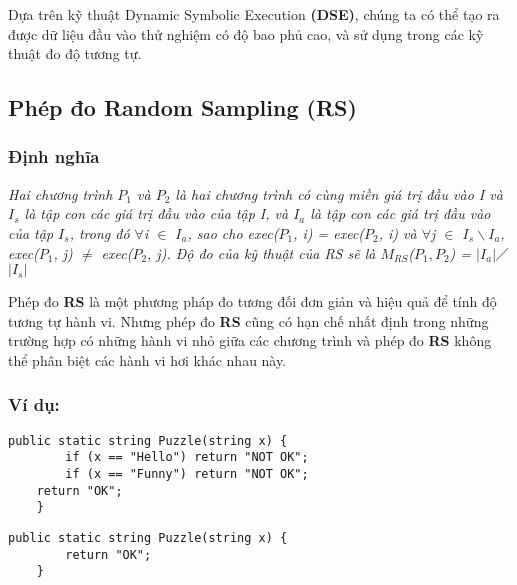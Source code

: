 Dựa trên kỹ thuật Dynamic Symbolic Execution \textbf{(DSE)}, chúng ta có thể tạo ra được dữ liệu đầu vào thử nghiệm có độ bao phủ cao, và sử dụng trong các kỹ thuật đo độ tương tự. \\

\subsection{Phép đo Random Sampling (RS)}
	\subsubsection{Định nghĩa}
	\textit{Hai chương trình $P_{1}$ và $P_{2}$ là hai chương trình có cùng miền giá trị đầu vào I và $I_{s}$ là tập con các giá trị đầu vào của tập I, và  $I_{a}$ là tập con các giá trị đầu vào của tập $I_{s}$, trong đó $\forall$i $\in$ $I_{a}$, sao cho exec($P_{1}$, i) = exec($P_{2}$, i) và $\forall$j $\in$ $I_{s} \backslash I_{a}$, exec($P_{1}$, j) $\neq$ exec($P_{2}$, j). Độ đo của kỹ thuật của RS sẽ là $M_{RS}$($P_{1},P_{2}$) = $\left|I_{a}\right|$$\diagup$$\left|I_{s}\right|$}
	
	Phép đo \textbf{RS} là một phương pháp đo tương đối đơn giản và hiệu quả để tính độ tương tự hành vi. Nhưng phép đo \textbf{RS} cũng có hạn chế nhất định trong những trường hợp có những hành vi nhỏ giữa các chương trình và phép đo \textbf{RS } không thể phân biệt các hành vi hơi khác nhau này.\\
	
	\subsubsection{Ví dụ:}
	
	\renewcommand{\lstlistingname}{Chương trình}
	\begin{lstlisting}[language={[Sharp]C}, caption={Chương trình $P_{1}$}, label={Script}]
	public static string Puzzle(string x) {
		if (x == "Hello") return "NOT OK";
		if (x == "Funny") return "NOT OK";
	return "OK";
	}
	\end{lstlisting}
	
	\renewcommand{\lstlistingname}{Chương trình}
	\begin{lstlisting}[language={[Sharp]C}, caption={Chương trình $P_{2}$}, label={Script}]
	public static string Puzzle(string x) {
		return "OK";
	}
	\end{lstlisting}
	
